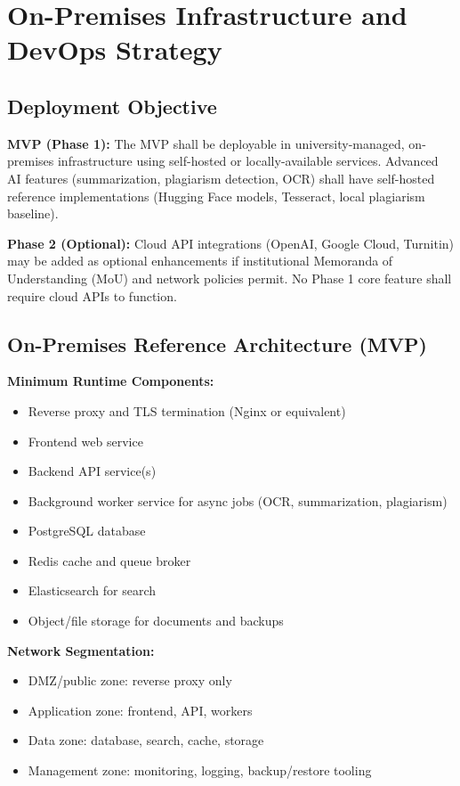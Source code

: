 \documentclass[12pt,a4paper]{report}
\begin{document}
\chapter{On-Premises Infrastructure and DevOps Strategy}

\section{Deployment Objective}
\textbf{MVP (Phase 1):} The MVP shall be deployable in university-managed, on-premises infrastructure using self-hosted or locally-available services. Advanced AI features (summarization, plagiarism detection, OCR) shall have self-hosted reference implementations (Hugging Face models, Tesseract, local plagiarism baseline).

\textbf{Phase 2 (Optional):} Cloud API integrations (OpenAI, Google Cloud, Turnitin) may be added as optional enhancements if institutional Memoranda of Understanding (MoU) and network policies permit. No Phase 1 core feature shall require cloud APIs to function.

\section{On-Premises Reference Architecture (MVP)}

\textbf{Minimum Runtime Components:}
\begin{itemize}
    \item Reverse proxy and TLS termination (Nginx or equivalent)
    \item Frontend web service
    \item Backend API service(s)
    \item Background worker service for async jobs (OCR, summarization, plagiarism)
    \item PostgreSQL database
    \item Redis cache and queue broker
    \item Elasticsearch for search
    \item Object/file storage for documents and backups
\end{itemize}

\textbf{Network Segmentation:}
\begin{itemize}
    \item DMZ/public zone: reverse proxy only
    \item Application zone: frontend, API, workers
    \item Data zone: database, search, cache, storage
    \item Management zone: monitoring, logging, backup/restore tooling
\end{itemize}
\end{document}
